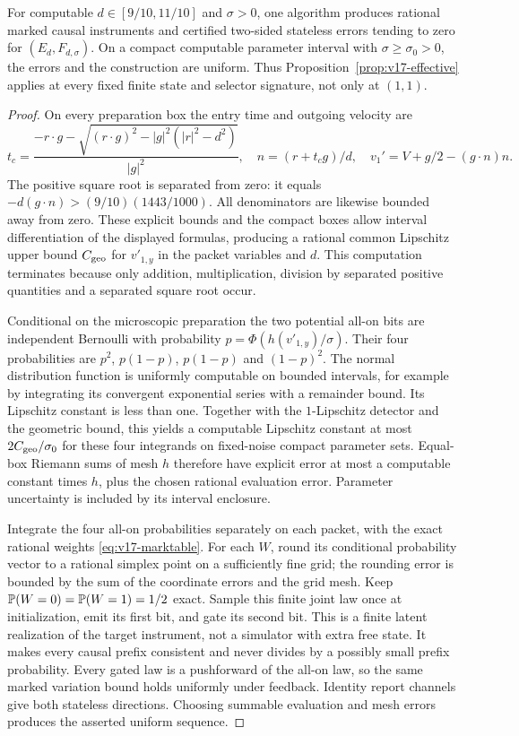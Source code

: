 \begin{proposition}
\label{prop:v17-collisioncompute}
For computable $d\in[9/10,11/10]$ and $\sigma>0$, one algorithm
produces rational marked causal instruments and certified two-sided
stateless errors tending to zero for $(E_d,F_{d,\sigma})$. On a compact
computable parameter interval with $\sigma\ge\sigma_0>0$, the errors
and the construction are uniform. Thus
Proposition~\ref{prop:v17-effective} applies at every fixed finite
state and selector signature, not only at $(1,1)$.
\end{proposition}
\begin{proof}
On every preparation box the entry time and outgoing velocity are
\[
 t_c=\frac{-r\cdot g-\sqrt{(r\cdot g)^2-|g|^2(|r|^2-d^2)}}{|g|^2},
 \quad n=(r+t_cg)/d,
 \quad v_1'=V+g/2-(g\cdot n)n.
\]
The positive square root is separated from zero: it equals
$-d(g\cdot n)> (9/10)(1443/1000)$. All denominators are likewise
bounded away from zero. These explicit bounds and the compact boxes
allow interval differentiation of the displayed formulas, producing
a rational common Lipschitz upper bound $C_{\rm geo}$ for $v'_{1,y}$
in the packet variables and $d$. This computation terminates because
only addition, multiplication, division by separated positive
quantities and a separated square root occur.

Conditional on the microscopic preparation the two potential all-on
bits are independent Bernoulli with probability
$p=\Phi(h(v'_{1,y})/\sigma)$. Their four probabilities are
$p^2$, $p(1-p)$, $p(1-p)$ and $(1-p)^2$.
The normal distribution function is uniformly computable on bounded
intervals, for example by integrating its convergent exponential
series with a remainder bound. Its Lipschitz constant is less than
one. Together with the $1$-Lipschitz detector and the geometric bound,
this yields a computable Lipschitz constant at most
$2C_{\rm geo}/\sigma_0$ for these four integrands on fixed-noise
compact parameter sets. Equal-box Riemann sums of mesh $h$ therefore
have explicit error at most a computable constant times $h$, plus the
chosen rational evaluation error. Parameter uncertainty is included
by its interval enclosure.

Integrate the four all-on probabilities separately on each packet,
with the exact rational weights \eqref{eq:v17-marktable}. For each
$W$, round its conditional probability vector to a rational simplex
point on a sufficiently fine grid; the rounding error is bounded by
the sum of the coordinate errors and the grid mesh. Keep
$\mathbb P(W=0)=\mathbb P(W=1)=1/2$ exact. Sample this finite joint law once at
initialization, emit its first bit, and gate its second bit. This is
a finite latent realization of the target instrument, not a simulator
with extra free state. It makes every causal prefix consistent and
never divides by a possibly small prefix probability. Every gated
law is a pushforward of the all-on law, so the same marked variation
bound holds uniformly under feedback. Identity report channels give
both stateless directions. Choosing summable evaluation and mesh
errors produces the asserted uniform sequence.
\end{proof}
